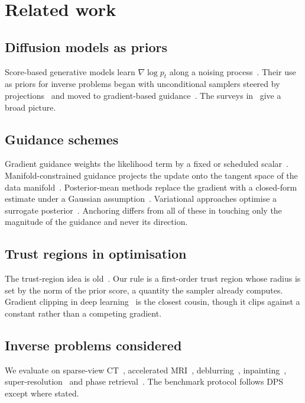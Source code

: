 \section{Related work}
\label{sec:related}
\subsection{Diffusion models as priors}
Score-based generative models learn $\nabla \log p_t$ along a noising process~\cite{song2019,song2021sde,ho2020ddpm}. Their use as priors for inverse problems began with unconditional samplers steered by projections~\cite{song2022medical,chung2022mri} and moved to gradient-based guidance~\cite{chung2023dps,kawar2022ddrm,wang2023ddnm}. The surveys in~\cite{daras2024survey,li2024survey} give a broad picture.

\subsection{Guidance schemes}
Gradient guidance weights the likelihood term by a fixed or scheduled scalar~\cite{chung2023dps,song2023pigdm}. Manifold-constrained guidance projects the update onto the tangent space of the data manifold~\cite{chung2022mcg}. Posterior-mean methods replace the gradient with a closed-form estimate under a Gaussian assumption~\cite{song2023pigdm,rout2023psld}. Variational approaches optimise a surrogate posterior~\cite{mardani2023red,feng2023score}. Anchoring differs from all of these in touching only the magnitude of the guidance and never its direction.

\subsection{Trust regions in optimisation}
The trust-region idea is old~\cite{conn2000trust,nocedal2006}. Our rule is a first-order trust region whose radius is set by the norm of the prior score, a quantity the sampler already computes. Gradient clipping in deep learning~\cite{pascanu2013clip,zhang2020clip} is the closest cousin, though it clips against a constant rather than a competing gradient.

\subsection{Inverse problems considered}
We evaluate on sparse-view CT~\cite{jin2017fbpconvnet,okonkwo2021}, accelerated MRI~\cite{zbontar2018fastmri,lindqvist2022}, deblurring~\cite{krishnan2009deblur}, inpainting~\cite{lugmayr2022repaint}, super-resolution~\cite{saharia2022sr3} and phase retrieval~\cite{metzler2018prdeep,fienup1982phase}. The benchmark protocol follows DPS~\cite{chung2023dps} except where stated.
